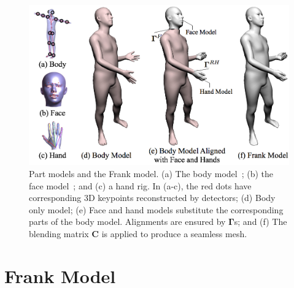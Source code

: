 %


\begin{figure}[t]
	\includegraphics[trim={1cm 0 0 0 }, width=\columnwidth]{tbc_figures/building_frank_3}
	\caption{Part models and the Frank model. (a) The body model~\cite{Loper2015}; (b) the face model~\cite{cao2014facewarehouse}; and (c) a hand rig. In (a-c), the red dots have corresponding 3D keypoints reconstructed by detectors; (d) Body only model; (e) Face and hand models substitute the corresponding parts of the body model. Alignments are ensured by  $\mathbf{\Gamma}$s; and (f) The blending matrix $\mathbf{C}$ is applied to produce a seamless mesh.} %
	\label{fig:frankenstein_part_aligned}
\end{figure}

\section{Frank Model}

